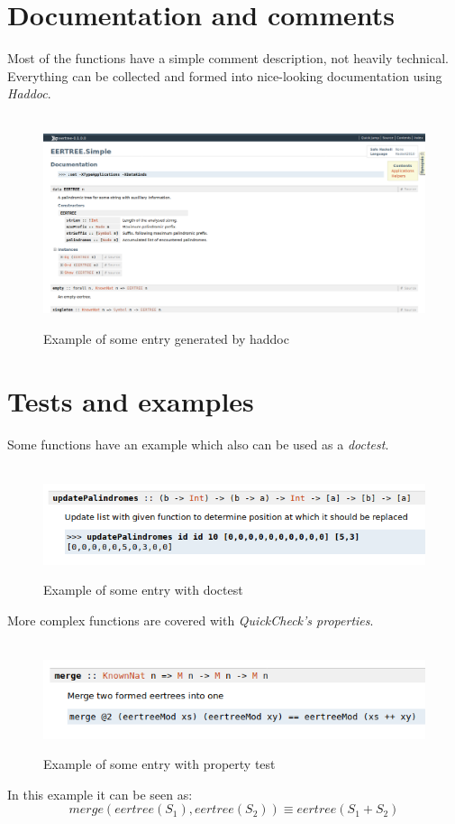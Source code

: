 \section{Documentation and comments}
Most of the functions have a simple comment description, not heavily technical. Everything can be collected and formed into nice-looking documentation using \textit{Haddoc}.
\begin{figure}[H]
  \centering
     \includegraphics[width=\linewidth]{haddoc.png}
 \caption{Example of some entry generated by haddoc}
\end{figure}
\section{Tests and examples}
Some functions have an example which also can be used as a \textit{doctest}.
\begin{figure}[H]
  \centering
     \includegraphics[width=\linewidth]{doctest.png}
 \caption{Example of some entry with doctest}
\end{figure}
\vfill\eject
More complex functions are covered with \textit{QuickCheck's properties}.
\begin{figure}[H]
  \centering
     \includegraphics[width=\linewidth]{prop.png}
 \caption{Example of some entry with property test}
\end{figure}





In this example it can be seen as:
$$merge(eertree(S_1), eertree(S_2)) \equiv eertree(S_1 + S_2) $$